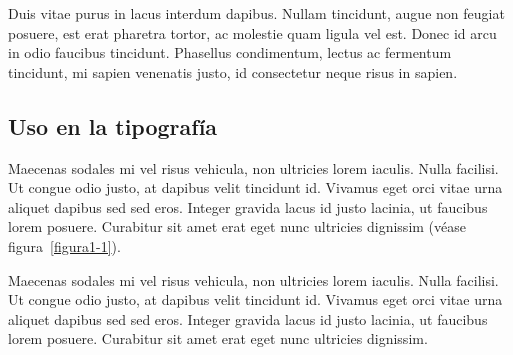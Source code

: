 Duis vitae purus in lacus interdum dapibus. Nullam tincidunt, augue non feugiat posuere, est erat pharetra tortor, ac molestie quam ligula vel est. Donec id arcu in odio faucibus tincidunt. Phasellus condimentum, lectus ac fermentum tincidunt, mi sapien venenatis justo, id consectetur neque risus in sapien.

\subsection{Uso en la tipografía}

Maecenas sodales mi vel risus vehicula, non ultricies lorem iaculis. Nulla facilisi. Ut congue odio justo, at dapibus velit tincidunt id. Vivamus eget orci vitae urna aliquet dapibus sed sed eros. Integer gravida lacus id justo lacinia, ut faucibus lorem posuere. Curabitur sit amet erat eget nunc ultricies dignissim (véase figura~\ref{figura1-1}).

Maecenas sodales mi vel risus vehicula, non ultricies lorem iaculis. Nulla facilisi. Ut congue odio justo, at dapibus velit tincidunt id. Vivamus eget orci vitae urna aliquet dapibus sed sed eros. Integer gravida lacus id justo lacinia, ut faucibus lorem posuere. Curabitur sit amet erat eget nunc ultricies dignissim.

